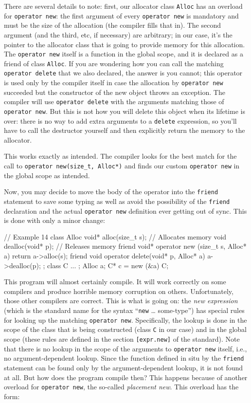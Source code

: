 There are several details to note: first, our allocator class \texttt{Alloc} has an overload for \texttt{operator\ new}: the first argument of every \texttt{operator\ new} is mandatory and must be the size of the allocation (the compiler fills that in). The second argument (and the third, etc, if necessary) are arbitrary; in our case, it's the pointer to the allocator class that is going to provide memory for this allocation. The \texttt{operator\ new} itself is a function in the global scope, and it is declared as a friend of class \texttt{Alloc}. If you are wondering how you can call the matching \texttt{operator\ delete} that we also declared, the answer is you cannot; this operator is used only by the compiler itself in case the allocation by \texttt{operator\ new} succeeded but the constructor of the new object throws an exception. The compiler will use \texttt{operator\ delete} with the arguments matching those of \texttt{operator\ new}. But this is not how you will delete this object when its lifetime is over: there is no way to add extra arguments to a \texttt{delete} expression, so you'll have to call the destructor yourself and then explicitly return the memory to the allocator.

This works exactly as intended. The compiler looks for the best match for the call to \texttt{operator\ new(size\_t,\ Alloc*)} and finds our custom \texttt{operator\ new} in the global scope as intended.

Now, you may decide to move the body of the operator into the \texttt{friend} statement to save some typing as well as avoid the possibility of the \texttt{friend} declaration and the actual \texttt{operator\ new} definition ever getting out of sync. This is done with only a minor change:

\begin{code}
// Example 14
class Alloc {
  void* alloc(size_t s);    // Allocates memory
  void dealloc(void* p);     // Releases memory
  friend void* operator new (size_t s, Alloc* a) {
    return a->alloc(s);
  }
  friend void operator delete(void* p, Alloc* a) {
    a->dealloc(p);
  }
};
class C { ... };
Alloc a;
C* c = new (&a) C;
\end{code}

This program will almost certainly compile. It will work correctly on some compilers and produce horrible memory corruption on others. Unfortunately, those other compilers are correct. This is what is going on: the \emph{new expression} (which is the standard name for the syntax ``\texttt{new} \ldots{} some-type'') has special rules for looking up the matching \texttt{operator\ new}. Specifically, the lookup is done in the scope of the class that is being constructed (class \texttt{C} in our case) and in the global scope (these rules are defined in the section \texttt{{[}expr.new{]}} of the standard). Note that there is no lookup in the scope of the arguments to \texttt{operator\ new} itself, i.e., no argument-dependent lookup. Since the function defined in situ by the \texttt{friend} statement can be found only by the argument-dependent lookup, it is not found at all. But how does the program compile then? This happens because of another overload for \texttt{operator\ new}, the so-called \emph{placement new}. This overload has the form:

